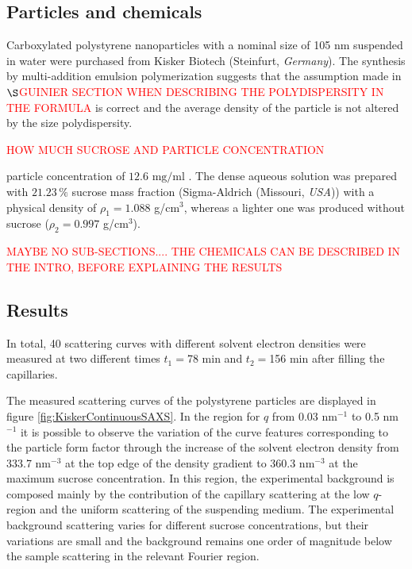 \subsection{Particles and chemicals}
Carboxylated polystyrene nanoparticles with a nominal size of 105 nm suspended in water were purchased from Kisker Biotech (Steinfurt, \emph{Germany}). The synthesis by multi-addition emulsion polymerization suggests that the assumption made in \(\S\)\textcolor{red}{GUINIER SECTION WHEN DESCRIBING THE POLYDISPERSITY IN THE FORMULA} is correct and the average density of the particle is not altered by the size polydispersity.

\textcolor{red}{HOW MUCH SUCROSE AND PARTICLE CONCENTRATION}

 particle concentration of \(12.6 \mbox{ mg/ml} \) . The dense aqueous solution was prepared with \( 21.23\,\%\) sucrose mass fraction (Sigma-Aldrich (Missouri, \emph{USA})) with a physical density of \(\rho_1=1.088 \) g/cm\(^3\), whereas a lighter one was produced without sucrose (\(\rho_2=0.997 \) g/cm\(^3\)).
 
\textcolor{red}{MAYBE NO SUB-SECTIONS.... THE CHEMICALS CAN BE DESCRIBED IN THE INTRO, BEFORE EXPLAINING THE RESULTS} 

\subsection{Results}

In total, 40 scattering curves with different solvent electron densities were measured at two different times \(t_1=\)78 min and \(t_2=\)156 min after filling the capillaries.

The measured scattering curves of the polystyrene particles are displayed in figure \ref{fig:KiskerContinuousSAXS}. In the region for \(q\) from 0.03 nm\(^{-1}\) to 0.5 nm\(^{-1}\) it is possible to observe the variation of the curve features corresponding to the particle form factor through the increase of the solvent electron density from 333.7 nm\(^{-3}\) at the top edge of the density gradient to 360.3 nm\(^{-3}\) at the maximum sucrose concentration. In this region, the experimental background is composed mainly by the contribution of the capillary scattering at the low $q$-region and the uniform scattering of the suspending medium. The experimental background scattering varies for different sucrose concentrations, but their variations are small and the background remains one order of magnitude below the sample scattering in the relevant Fourier region.

